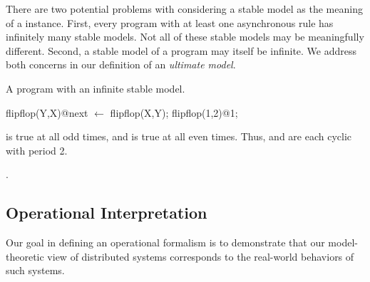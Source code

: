 There are two potential problems with considering a stable model as the meaning of a \lang instance.  First, every program with at least one asynchronous rule has infinitely many stable models.  Not all of these stable models may be meaningfully different.  Second, a stable model of a \lang program may itself be infinite.  We address both concerns in our definition of an {\em ultimate model}.

\begin{example}
\label{ex:flipflop}
A \lang program with an infinite stable model.

\begin{Dedalus}
flipflop(Y,X)@next \(\leftarrow\) flipflop(X,Y);
flipflop(1,2)@1;
\end{Dedalus}

 is true at all odd times, and  is true at all even times.  Thus,  and  are each cyclic with period 2.
\end{example}

.



\subsection{Operational Interpretation}
\label{sec:operational}

Our goal in defining an operational formalism is to demonstrate that our model-theoretic view of distributed systems corresponds to the real-world behaviors of such systems.


